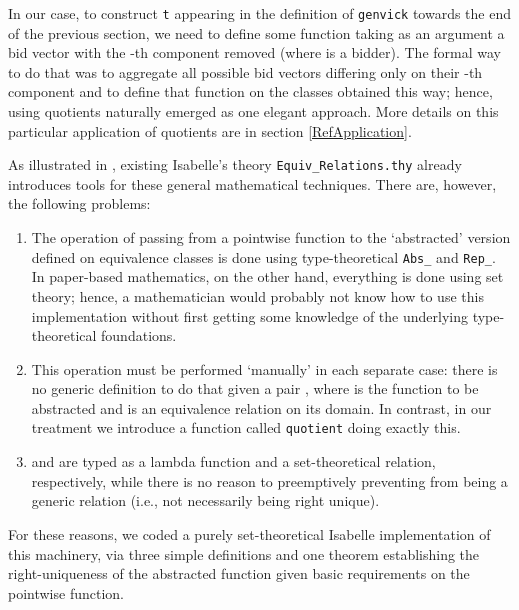 \documentclass[
]{llncs}
\newcommand{\I}{Isabelle}
\begin{document}
In our case, to construct \verb|t| 
appearing in the definition of \verb|genvick| towards the end of the previous section, 
we need to define some function taking as an argument a bid vector with the -th component removed (where  is a bidder).
The formal way to do that was to aggregate all possible bid vectors differing only on their -th component and to define that function on the classes obtained this way; hence, using quotients naturally emerged as one elegant approach.
More details on this particular application of quotients are in section \ref{RefApplication}.

As illustrated in \cite{paulson2006defining}, existing \I{}'s theory \verb|Equiv_Relations.thy| already introduces tools for these general mathematical techniques.
There are, however, the following problems:
\begin{enumerate}
\item
The operation of passing from a pointwise function to the `abstracted{}' version defined on equivalence classes is done using type-theoretical \verb|Abs_| and \verb|Rep_|.
In paper-based mathematics, on the other hand, everything is done using set theory; hence, a mathematician would probably not know how to use this implementation without first getting some knowledge of the underlying type-theoretical foundations.
\item
This operation must be performed `manually{}' in each separate case: there is no generic definition to do that given a pair , where  is the function to be abstracted and  is an equivalence relation on its domain.
In contrast, in our treatment we introduce a function called \verb|quotient| doing exactly this.
\item
 and  are typed as a lambda function and a set-theoretical relation, respectively, while there is no reason to preemptively preventing  from being a generic relation (i.e., not necessarily being right unique).
\end{enumerate}



For these reasons, we coded a purely set-theoretical \I{} implementation of this machinery, via three simple definitions and one theorem establishing the right-uniqueness of the abstracted function given basic requirements on the pointwise function.
\end{document}

